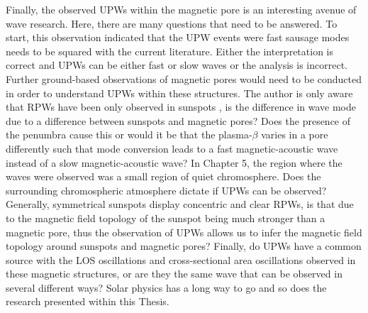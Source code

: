     Finally, the observed UPWs within the magnetic pore is an interesting avenue of wave research.
    Here, there are many questions that need to be answered.
    To start, this observation indicated that the UPW events were fast sausage modes needs to be squared with the current literature.
    Either the interpretation is correct and UPWs can be either fast or slow waves or the analysis is incorrect.
    Further ground-based observations of magnetic pores would need to be conducted in order to understand UPWs within these structures.
    The author is only aware that RPWs have been only observed in sunspots , is the difference in wave mode due to a difference between sunspots and magnetic pores? 
    Does the presence of the penumbra cause this or would it be that the plasma-$\beta$ varies in a pore differently such that mode conversion leads to a fast magnetic-acoustic wave instead of a slow magnetic-acoustic wave?
    In Chapter 5, the region where the waves were observed was a small region of quiet chromosphere.
    Does the surrounding chromospheric atmosphere dictate if UPWs can be observed?
    Generally, symmetrical sunspots display concentric and clear RPWs, is that due to the magnetic field topology of the sunspot being much stronger than a magnetic pore, thus the observation of UPWs allows us to infer the magnetic field topology around sunspots and magnetic pores?
    Finally, do UPWs have a common source with the LOS oscillations and cross-sectional area oscillations observed in these magnetic structures, or are they the same wave that can be observed in several different ways?
    Solar physics has a long way to go and so does the research presented within this Thesis.
